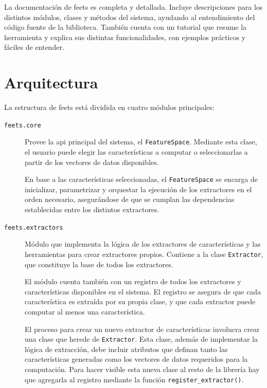 \begin{description}[resume]
    \item[Documentación extensa]
    La documentación de \gls{feets} es completa y detallada. Incluye descripciones para los distintos módulos, clases y métodos del sistema, ayudando al entendimiento del código fuente de la biblioteca.
    También cuenta con un tutorial que resume la herramienta y explica sus distintas funcionalidades, con ejemplos prácticos y fáciles de entender.
\end{description}

\section{Arquitectura}

La estructura de \gls{feets} está dividida en cuatro módulos principales:

\begin{description}
    \item[\texttt{feets.core}] Provee la \gls{api} principal del sistema, el \texttt{FeatureSpace}. Mediante esta clase, el usuario puede elegir las características a computar o seleccionarlas a partir de los vectores de datos disponibles.

    En base a las características seleccionadas, el \texttt{FeatureSpace} se encarga de inicializar, parametrizar y orquestar la ejecución de los extractores en el orden necesario, asegurándose de que se cumplan las dependencias establecidas entre los distintos extractores.

    \item[\texttt{feets.extractors}] Módulo que implementa la lógica de los extractores de características y las herramientas para crear extractores propios. Contiene a la clase \texttt{Extractor}, que constituye la base de todos los extractores.
    
    El módulo cuenta también con un registro de todos los extractores y características disponibles en el sistema. El registro se asegura de que cada característica es extraída por su propia clase, y que cada extractor puede computar al menos una característica.
    
    El proceso para crear un nuevo extractor de características involucra crear una clase que herede de \texttt{Extractor}. Esta clase, además de implementar la lógica de extracción, debe incluir atributos que definan tanto las características generadas como los vectores de datos requeridos para la computación. Para hacer visible esta nueva clase al resto de la librería hay que agregarla al registro mediante la función \texttt{register\_extractor()}.


\end{description}
